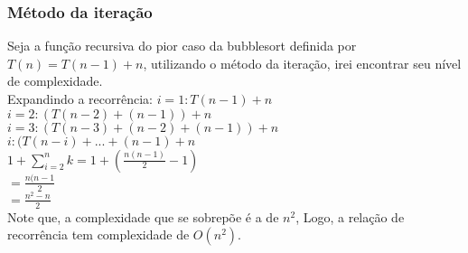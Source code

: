 \subsubsection{Método da iteração}
Seja a função recursiva do pior caso da bubblesort definida por $T(n) = T(n-1) + n$, utilizando o método da iteração, irei encontrar seu nível de complexidade. \\
Expandindo a recorrência:
$i = 1 : T(n - 1) + n$ \\
$i = 2 : (T(n - 2) + (n -1)) + n$ \\
$i = 3 : (T(n - 3) + (n - 2) + (n - 1)) + n$ \\
$i : (T(n - i) + ... + (n - 1) + n$ \\
$1 + \sum_{i=2}^{n}k = 1 + (\frac{n(n-1)}{2} - 1)$ \\
$= \frac{n(n-1}{2}$ \\
$= \frac{n^2 - n}{2}$ \\
Note que, a complexidade que se sobrepõe é a de $n^2$, Logo, a relação de recorrência tem complexidade de $O(n^2)$.